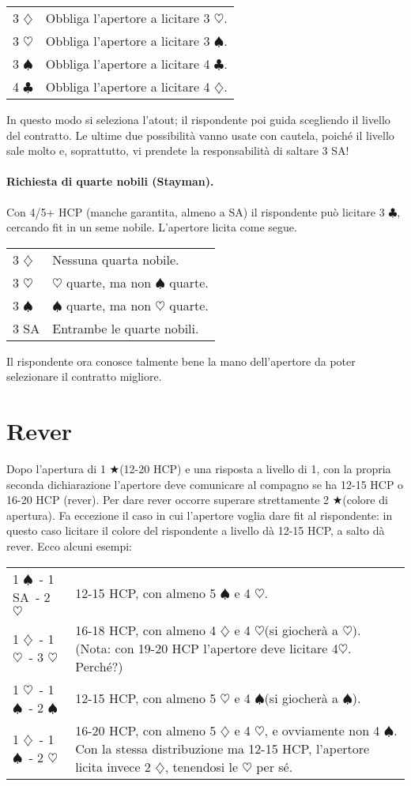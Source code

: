 \documentclass[a4paper,10pt]{article}
\renewcommand{\c}{$\clubsuit$\xspace}
\renewcommand{\d}{$\diamondsuit$\xspace}
\newcommand{\h}{$\heartsuit$\xspace}
\newcommand{\s}{$\spadesuit$\xspace}
\renewcommand{\j}{$\bigstar$\xspace}
\newcommand{\sa}{SA\xspace}
\newcommand{\smallspace}{\vskip0.3cm}
\newenvironment{twocol}
  {\smallspace\noindent\begin{tabular}{l p{0.78\textwidth}}}
  {\end{tabular}\smallspace}
\begin{document}
\begin{twocol}
 3 \d & Obbliga l'apertore a licitare 3 \h.\\
 3 \h & Obbliga l'apertore a licitare 3 \s.\\
 3 \s & Obbliga l'apertore a licitare 4 \c.\\
 4 \c & Obbliga l'apertore a licitare 4 \d.\\
\end{twocol}

In questo modo si seleziona l'atout; il rispondente poi guida scegliendo il livello del contratto. Le ultime due possibilità vanno usate con cautela, poiché il livello sale molto e, soprattutto, vi prendete la responsabilità di saltare 3 \sa!

\paragraph{Richiesta di quarte nobili (Stayman).} Con 4/5+ HCP (manche garantita, almeno a \sa) il rispondente può licitare 3 \c, cercando fit in un seme nobile. L'apertore licita come segue.

\begin{twocol}
 3 \d & Nessuna quarta nobile.\\
 3 \h & \h quarte, ma non \s quarte.\\
 3 \s & \s quarte, ma non \h quarte.\\
 3 SA & Entrambe le quarte nobili.
\end{twocol}

Il rispondente ora conosce talmente bene la mano dell'apertore da poter selezionare il contratto migliore.

\section{Rever}

Dopo l'apertura di 1 \j (12-20 HCP) e una risposta a livello di 1, con la propria seconda dichiarazione l'apertore deve comunicare al compagno se ha 12-15 HCP o 16-20 HCP (rever). Per dare rever occorre superare strettamente 2 \j (colore di apertura). Fa eccezione il caso in cui l'apertore voglia dare fit al rispondente: in questo caso licitare il colore del rispondente a livello dà 12-15 HCP, a salto dà rever. Ecco alcuni esempi:

\begin{twocol}
1 \s\ - 1 \sa\ - 2 \h & 12-15 HCP, con almeno 5 \s e 4 \h.\\
1 \d\ - 1 \h\ - 3 \h & 16-18 HCP, con almeno 4 \d e 4 \h (si giocherà a \h). (Nota: con 19-20 HCP l'apertore deve licitare 4\h. Perché?)\\
1 \h\ - 1 \s\ - 2 \s & 12-15 HCP, con almeno 5 \h e 4 \s (si giocherà a \s).\\
1 \d\ - 1 \s\ - 2 \h & 16-20 HCP, con almeno 5 \d e 4 \h, e ovviamente non 4 \s. Con la stessa distribuzione ma 12-15 HCP, l'apertore licita invece 2 \d, tenendosi le \h per sé.
\end{twocol}
\end{document}
